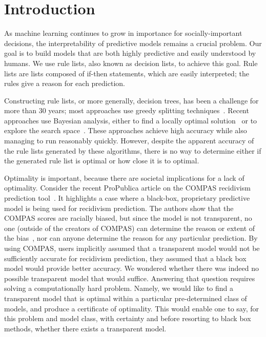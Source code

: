 %
%
%
%
%
%

\section{Introduction}

As machine learning continues to grow in importance for socially-important decisions, the interpretability of predictive models remains a crucial problem. Our goal is to build models that are both highly predictive and easily understood by humans. We use rule lists, also known as decision lists, to achieve this goal. Rule lists are lists composed of if-then statements, which are easily interpreted; the rules give a reason for each prediction.

Constructing rule lists, or more generally, decision trees, has been a challenge for more than
30 years; most approaches use greedy splitting techniques~\cite{Rivest87,Breiman84,Quinlan93}. 
%
Recent approaches use Bayesian analysis, either to find a locally optimal solution~\cite{Chipman:1998jh} or to explore the search space~\citep{LethamRuMcMa15, YangRuSe16}.
%
These approaches achieve high accuracy while also managing to run reasonably quickly. However, despite the apparent accuracy of the rule lists generated by these algorithms, there is no way to determine either if the generated rule list is optimal or how close it is to optimal.

Optimality is important, because there are societal implications for a lack of optimality.
%
Consider the recent ProPublica article on the COMPAS recidivism prediction tool~\citep{LarsonMaKiAn16}.
%
It highlights a case where a black-box, proprietary predictive model is being used for recidivism prediction.
%
The authors show that the COMPAS scores are racially biased, but since the model is not transparent, no one (outside of the creators of COMPAS) can determine the reason or extent of the bias~\citep{LarsonMaKiAn16}, nor can anyone determine the reason for any particular prediction.
%
By using COMPAS, users implicitly assumed that a transparent model
would not be sufficiently accurate for recidivism prediction,
\ie they assumed that a black box model would provide better accuracy.
%
We wondered whether there was indeed no possible transparent model that would suffice.
%
Answering that question requires solving a computationally hard problem.
%
Namely, we would like to find a transparent model that is optimal
within a particular pre-determined class of models,
and produce a certificate of optimality.
%
This would enable one to say, for this problem and model class,
with certainty and before resorting to black box methods,
whether there exists a transparent model.

